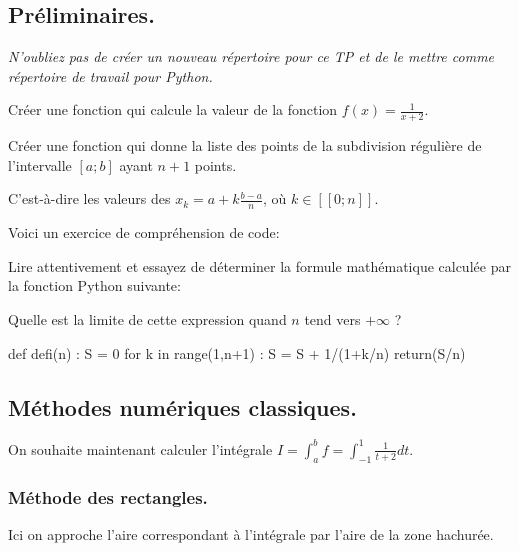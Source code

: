 \documentclass[french,11pt,twoside]{VcCours}
\begin{document}

\tableofcontents
\separationTitre


\subsection*{Préliminaires.}

\emph{N'oubliez pas de créer un nouveau répertoire pour ce TP et de
le mettre comme répertoire de travail pour Python.}

\begin{Exercice}{}
Créer une fonction  qui calcule la valeur de la fonction
$f(x)=\frac{1}{x+2}$.
\end{Exercice}

\begin{Exercice}{}
Créer une fonction  qui donne la liste des points de
la subdivision régulière de l'intervalle $[a;b]$ ayant $n+1$
points.

C'est-à-dire les valeurs des $x_k=a+k\frac{b-a}{n}$, où
$k\in[\![0;n]\!]$.
\end{Exercice}

Voici un exercice de compréhension de code:

\begin{Exercice}{}
Lire attentivement et essayez de déterminer la formule mathématique 
calculée par la fonction Python suivante:

Quelle est la limite de cette expression quand $n$ tend vers $+\infty$ ?
\end{Exercice}

\begin{Python}
  def defi(n) :
      S = 0
      for k in range(1,n+1) :
          S = S + 1/(1+k/n)
      return(S/n)
  \end{Python}
  

\subsection{Méthodes numériques classiques.}

On souhaite maintenant calculer l'intégrale $I=\int_a^b
f=\int_{-1}^1\frac{1}{t+2}dt$.

\subsubsection{Méthode des rectangles.}
Ici on approche l'aire correspondant à l'intégrale par l'aire de la
zone hachurée.
\end{document}
